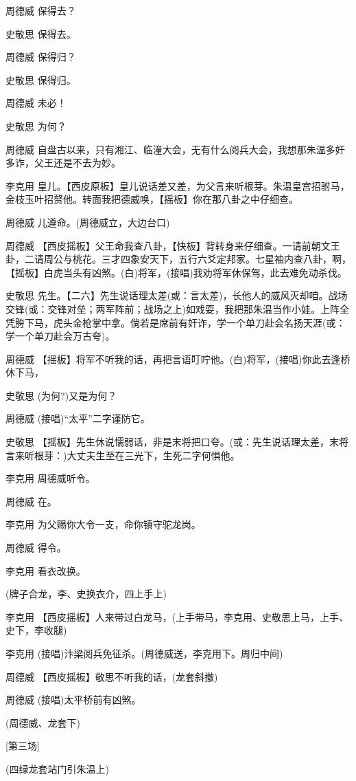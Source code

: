周德威 保得去？

史敬思 保得去。

周德威 保得归？

史敬思 保得归。

周德威 未必！

史敬思 为何？

周德威
自盘古以来，只有湘江、临潼大会，无有什么阅兵大会，我想那朱温多奸多诈，父王还是不去为妙。

李克用
皇儿。【西皮原板】皇儿说话差又差，为父言来听根芽。朱温皇宫招驸马，金枝玉叶招赘他。转面我把德威唤，【摇板】你在那八卦之中仔细查。

周德威 儿遵命。(周德威立，大边台口)

周德威
【西皮摇板】父王命我查八卦，【快板】背转身来仔细查。一请前朝文王卦，二请周公与桃花。三才四象安天下，五行六爻定邦家。七星袖内查八卦，啊，【摇板】白虎当头有凶煞。(白)将军，(接唱)我劝将军休保驾，此去难免动杀伐。

史敬思
先生。【二六】先生说话理太差(或：言太差)，长他人的威风灭却咱。战场交锋(或：交锋对垒；两军阵前；战场之上)如戏耍，我把那朱温当作小娃。上阵全凭胯下马，虎头金枪掌中拿。倘若是席前有奸诈，学一个单刀赴会名扬天涯(或：学一个单刀赴会万古夸)。

周德威
【摇板】将军不听我的话，再把言语叮咛他。(白)将军，(接唱)你此去逢桥休下马，

史敬思 (为何?)又是为何？

周德威 (接唱)``太平''二字谨防它。

史敬思
【摇板】先生休说懦弱话，非是末将把口夸。(或：先生说话理太差，末将言来听根芽：)大丈夫生至在三光下，生死二字何惧他。

李克用 周德威听令。

周德威 在。

李克用 为父赐你大令一支，命你镇守驼龙岗。

周德威 得令。

李克用 看衣改换。

(牌子合龙，李、史换衣介，四上手上)

李克用
【西皮摇板】人来带过白龙马，(上手带马，李克用、史敬思上马，上手、史下，李收腿)

李克用 (接唱)汴梁阅兵免征杀。(周德威送，李克用下。周归中间)

周德威 【西皮摇板】敬思不听我的话，(龙套斜撤)

周德威 (接唱)太平桥前有凶煞。

(周德威、龙套下)

{[}第三场{]}

(四绿龙套站门引朱温上)

